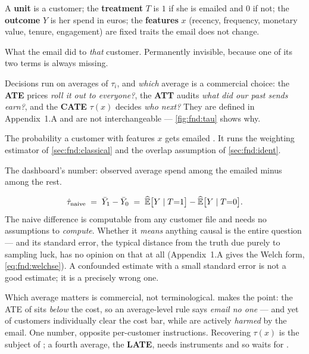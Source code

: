 \begin{description}[leftmargin=*, style=nextline, itemsep=.2em]
  \item[Unit, treatment, outcome, features.] A \textbf{unit} is a customer; the
    \textbf{treatment} $T$ is $1$ if she is emailed and $0$ if not; the \textbf{outcome} $Y$ is
    her spend in euros; the \textbf{features} $x$ (recency, frequency, monetary value, tenure,
    engagement) are fixed traits the email does not change.
  \item[Individual effect $\tau_i = Y_i(1) - Y_i(0)$.] What the email did to \emph{that}
    customer. Permanently invisible, because one of its two terms is always missing.
  \item[The three averages.] Decisions run on averages of $\tau_i$, and \emph{which} average is
    a commercial choice: the \textbf{ATE} prices \emph{roll it out to everyone?}, the
    \textbf{ATT} audits \emph{what did our past sends earn?}, and the \textbf{CATE} $\tau(x)$
    decides \emph{who next?} They are defined in Appendix~1.A and are not interchangeable ---
    \cref{fig:fnd:tau} shows why.
  \item[Propensity $e(x) = \Prob(T{=}1 \mid X{=}x)$.] The probability a customer with features
    $x$ gets emailed \citep{rosenbaum1983}. It runs the weighting estimator of
    \cref{sec:fnd:classical} and the overlap assumption of \cref{sec:fnd:ident}.
  \item[Naive difference $\hat\tau_{\text{naive}}$.] The dashboard's number: observed average
    spend among the emailed minus among the rest.
\end{description}
%
\begin{equation}
  \hat\tau_{\text{naive}} \;=\; \bar Y_1 - \bar Y_0
    \;=\; \widehat{\operatorname{\mathbb{E}}}\big[Y \mid T{=}1\big] - \widehat{\operatorname{\mathbb{E}}}\big[Y \mid T{=}0\big].
  \label{eq:fnd:naive}
\end{equation}
%
The naive difference is computable from any customer file and needs no assumptions to
\emph{compute}. Whether it \emph{means} anything causal is the entire question --- and its
standard error, the typical distance from the truth due purely to sampling luck, has no opinion
on that at all (Appendix~1.A gives the Welch form, \cref{eq:fnd:welchse}). A confounded estimate
with a small standard error is not a good estimate; it is a precisely wrong one.

Which average matters is commercial, not terminological.  makes the point: the
ATE of \eur{\nbZeroTrueAte} sits \emph{below} the \eur{\nbZeroCost} cost, so an average-level
rule says \emph{email no one} --- and yet \pc{\nbZeroShareAboveCost} of customers individually
clear the cost bar, while \pc{\nbZeroShareNegative} are actively \emph{harmed} by the email. One
number, opposite per-customer instructions. Recovering $\tau(x)$ is the subject of ;
a fourth average, the \textbf{LATE}, needs instruments and so waits for .

